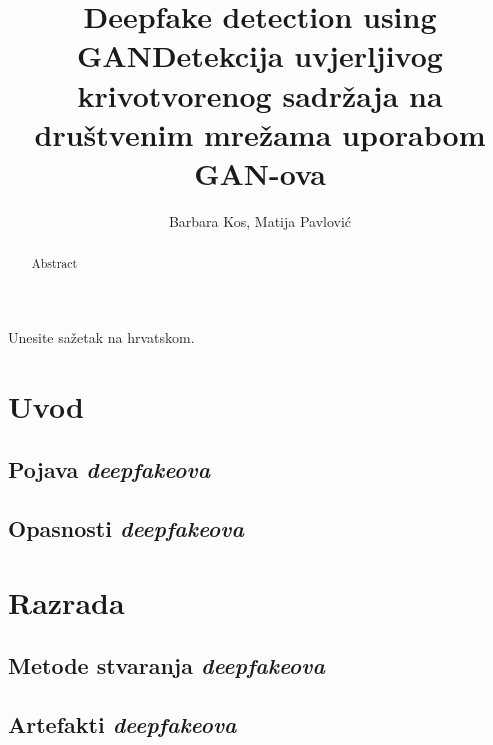 \documentclass[seminarski, times, utf8]{fer}
\title{Deepfake detection using GAN}
\title{Detekcija uvjerljivog krivotvorenog sadržaja na društvenim mrežama uporabom GAN-ova}
\author{Barbara Kos, Matija Pavlović}
\date{}
\date{}
\begin{document}
\maketitle



\begin{sazetak}
  Unesite sažetak na hrvatskom.
\end{sazetak}

\begin{kljucnerijeci}
 
\end{kljucnerijeci}

\begin{abstract}
  Abstract
\end{abstract}

\begin{keywords}
 
\end{keywords}


\tableofcontents


\chapter{Uvod}
\label{pog:uvod}
\section{Pojava \textbf{\textit{deepfakeova}}}
\section{Opasnosti \textbf{\textit{deepfakeova}}}

\chapter{Razrada}
\section{Metode stvaranja \textbf{\textit{deepfakeova}}}
\section{Artefakti \textbf{\textit{deepfakeova}}}
\end{document}

